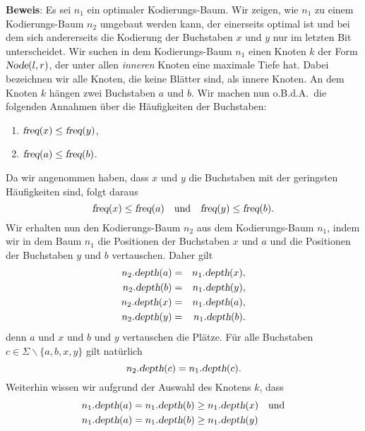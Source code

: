 \noindent
\textbf{Beweis}:  Es sei $n_1$ ein optimaler Kodierungs-Baum.  Wir zeigen, wie $n_1$ zu einem
Kodierungs-Baum $n_2$ umgebaut werden kann, der einerseits optimal ist und bei dem sich andererseits die
Kodierung der Buchstaben $x$ und $y$ nur im letzten Bit unterscheidet.  Wir suchen in dem Kodierungs-Baum
$n_1$ einen Knoten $k$ der Form $\textsl{Node}(l,r)$, der unter allen \emph{inneren} Knoten eine maximale
Tiefe hat.  Dabei bezeichnen wir alle Knoten, die keine Bl\"atter sind, als innere Knoten.
An dem Knoten $k$ h\"angen zwei Buchstaben $a$ und $b$.  Wir machen nun o.B.d.A.~die folgenden Annahmen
\"uber die H\"aufigkeiten der Buchstaben:
\begin{enumerate}
\item $\textsl{freq}(x) \leq \textsl{freq}(y)$,
\item $\textsl{freq}(a) \leq \textsl{freq}(b)$.
\end{enumerate}
Da wir angenommen haben, dass $x$ und $y$ die Buchstaben mit der geringsten H\"aufigkeiten sind, folgt
daraus
\begin{equation}
  \label{eq:huffmannL0}
\textsl{freq}(x) \leq \textsl{freq}(a) \quad \textrm{und} \quad 
\textsl{freq}(y) \leq \textsl{freq}(b).  
\end{equation}
Wir erhalten nun den Kodierungs-Baum $n_2$ aus dem Kodierungs-Baum $n_1$, indem wir in dem Baum $n_1$ die
Positionen der Buchstaben $x$ und $a$ und die Positionen der Buchstaben $y$ und $b$ vertauschen.
Daher gilt 
  \begin{eqnarray}
    \label{eq:huffmannL1a}
 n_2.\textsl{depth}(a) &=& n_1.\textsl{depth}(x), \\
    \label{eq:huffmannL1b}
 n_2.\textsl{depth}(b) &=& n_1.\textsl{depth}(y), \\
    \label{eq:huffmannL1c}
 n_2.\textsl{depth}(x) &=& n_1.\textsl{depth}(a), \\
    \label{eq:huffmannL1d}
 n_2.\textsl{depth}(y) &=& n_1.\textsl{depth}(b).
  \end{eqnarray}
denn $a$ und $x$ und $b$ und $y$ vertauschen die Pl\"atze.  F\"ur alle Buchstaben
$c \in \Sigma\backslash\{a,b,x,y\}$ gilt nat\"urlich 
\begin{equation}
  \label{eq:huffmannL1e}
n_2.\textsl{depth}(c) = n_1.\textsl{depth}(c).   
\end{equation}
Weiterhin wissen wir aufgrund der Auswahl des Knotens $k$, dass
\begin{eqnarray}
  \label{eq:huffmannL2a}
  n_1.\textsl{depth}(a) = n_1.\textsl{depth}(b) \geq n_1.\textsl{depth}(x) \quad \mathrm{und} \\
  \label{eq:huffmannL2b}
  n_1.\textsl{depth}(a) = n_1.\textsl{depth}(b) \geq n_1.\textsl{depth}(y) \hspace*{0.95cm}
\end{eqnarray}
